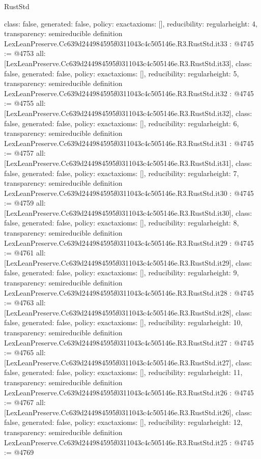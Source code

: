 \begin{lexlean}{RustStd}
\begin{coremodule}
{  class: false,
  generated: false,
  policy: exact{axioms: []},
  reducibility: regular{height: 4},
  transparency: semireducible
}
definition LexLeanPreserve.Cc639d244984595f0311043c4c505146e.R3.RustStd.it33 : @4745 := @4753 {
  all: [LexLeanPreserve.Cc639d244984595f0311043c4c505146e.R3.RustStd.it33],
  class: false,
  generated: false,
  policy: exact{axioms: []},
  reducibility: regular{height: 5},
  transparency: semireducible
}
definition LexLeanPreserve.Cc639d244984595f0311043c4c505146e.R3.RustStd.it32 : @4745 := @4755 {
  all: [LexLeanPreserve.Cc639d244984595f0311043c4c505146e.R3.RustStd.it32],
  class: false,
  generated: false,
  policy: exact{axioms: []},
  reducibility: regular{height: 6},
  transparency: semireducible
}
definition LexLeanPreserve.Cc639d244984595f0311043c4c505146e.R3.RustStd.it31 : @4745 := @4757 {
  all: [LexLeanPreserve.Cc639d244984595f0311043c4c505146e.R3.RustStd.it31],
  class: false,
  generated: false,
  policy: exact{axioms: []},
  reducibility: regular{height: 7},
  transparency: semireducible
}
definition LexLeanPreserve.Cc639d244984595f0311043c4c505146e.R3.RustStd.it30 : @4745 := @4759 {
  all: [LexLeanPreserve.Cc639d244984595f0311043c4c505146e.R3.RustStd.it30],
  class: false,
  generated: false,
  policy: exact{axioms: []},
  reducibility: regular{height: 8},
  transparency: semireducible
}
definition LexLeanPreserve.Cc639d244984595f0311043c4c505146e.R3.RustStd.it29 : @4745 := @4761 {
  all: [LexLeanPreserve.Cc639d244984595f0311043c4c505146e.R3.RustStd.it29],
  class: false,
  generated: false,
  policy: exact{axioms: []},
  reducibility: regular{height: 9},
  transparency: semireducible
}
definition LexLeanPreserve.Cc639d244984595f0311043c4c505146e.R3.RustStd.it28 : @4745 := @4763 {
  all: [LexLeanPreserve.Cc639d244984595f0311043c4c505146e.R3.RustStd.it28],
  class: false,
  generated: false,
  policy: exact{axioms: []},
  reducibility: regular{height: 10},
  transparency: semireducible
}
definition LexLeanPreserve.Cc639d244984595f0311043c4c505146e.R3.RustStd.it27 : @4745 := @4765 {
  all: [LexLeanPreserve.Cc639d244984595f0311043c4c505146e.R3.RustStd.it27],
  class: false,
  generated: false,
  policy: exact{axioms: []},
  reducibility: regular{height: 11},
  transparency: semireducible
}
definition LexLeanPreserve.Cc639d244984595f0311043c4c505146e.R3.RustStd.it26 : @4745 := @4767 {
  all: [LexLeanPreserve.Cc639d244984595f0311043c4c505146e.R3.RustStd.it26],
  class: false,
  generated: false,
  policy: exact{axioms: []},
  reducibility: regular{height: 12},
  transparency: semireducible
}
definition LexLeanPreserve.Cc639d244984595f0311043c4c505146e.R3.RustStd.it25 : @4745 := @4769 {
}
\end{coremodule}
\end{lexlean}
